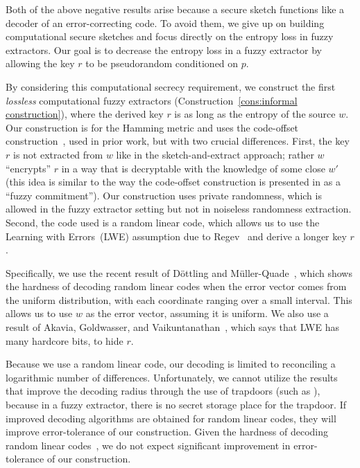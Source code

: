 \documentclass{llncs}
\newcommand{\consref}[1]{\mbox{Construction~\ref{#1}}}
\begin{document}
Both of the above negative results arise because a secure sketch functions like a decoder of an error-correcting code.  To avoid them, we give up on building computational secure sketches and focus directly on the entropy loss in fuzzy extractors.  Our goal is to decrease the entropy loss in a fuzzy extractor by allowing the key $r$ to be pseudorandom conditioned on $p$.  

By considering this computational secrecy requirement, we construct the first \emph{lossless} computational fuzzy extractors (\consref{cons:informal construction}), where the derived key $r$ is as long as the entropy of the source $w$. Our construction is for the Hamming metric and uses the code-offset construction~\cite{JW99},\cite[Section 5]{DBLP:journals/siamcomp/DodisORS08} used in prior work, but with two crucial differences.  First, the key $r$ is not extracted from $w$ like in the sketch-and-extract approach; rather $w$ ``encrypts'' $r$ in a way that is decryptable with the knowledge of some close $w'$ (this idea is similar to the way the code-offset construction is presented in 
\cite{JW99} as  a ``fuzzy commitment''). Our construction uses private randomness, which is allowed in the fuzzy extractor setting but not in noiseless randomness extraction.  Second, the code used is a random linear code, which allows us to use the Learning with Errors~(LWE) assumption due to Regev~\cite{regev2005LWE,regevLWEsurvey} and derive a longer key $r$.


Specifically,  we use the  recent result of D\"{o}ttling and M\"{u}ller-Quade~\cite{dottling2012}, which shows the hardness of decoding random linear codes when the error vector comes from the uniform distribution, with each coordinate ranging over a small interval. This allows us to use $w$ as the error vector, assuming it is uniform.  We also use a result of Akavia, Goldwasser, and Vaikuntanathan~\cite{akavia2009},  which says that LWE has many hardcore bits, to hide $r$.

Because we use a random linear code,  our decoding is limited to reconciling a logarithmic number of differences.  Unfortunately, we  cannot utilize the results that improve the decoding radius through the use of trapdoors (such as \cite{regev2005LWE}), because in a fuzzy extractor, there is no secret storage place for the trapdoor. If improved decoding algorithms are obtained for random linear codes, they will improve error-tolerance of our construction.  Given the hardness of decoding random linear codes~\cite{berlekamp1978}, we do not expect significant improvement in error-tolerance of our construction.
\end{document}
